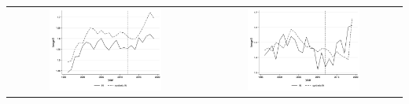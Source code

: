 \documentclass[11pt]{article}
\begin{document}
{\begin{landscape}
\begin{table}[ht!]
\begin{tabular}{c c}
          \includegraphics[width = 0.6\textwidth, keepaspectratio]{figures/fin_synth_wf_in.png} & \includegraphics[width = 0.6\textwidth, keepaspectratio]{figures/fin_synth_bf_in.png}
    \end{tabular}
\end{table}
\end{landscape}

}
\end{document}
